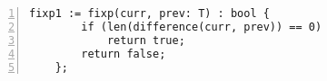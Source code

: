 \begin{figure}
	\begin{lstlisting}[numbers=left, tabsize=4, escapechar=@,label={lst:fixp-imp}] 
	fixp1 := fixp(curr, prev: T) : bool {
		if (len(difference(curr, prev)) == 0)
			return true;	
		return false;
	};
	\end{lstlisting}
\end{figure}

